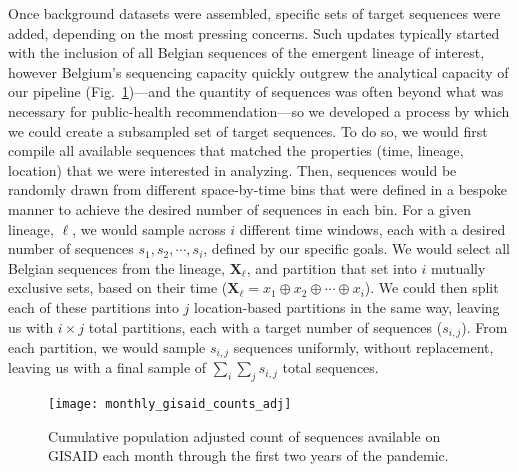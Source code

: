 Once background datasets were assembled, specific sets of target sequences were added, depending on the most pressing concerns.
Such updates typically started with the inclusion of all Belgian sequences of the emergent lineage of interest, however Belgium's sequencing capacity quickly outgrew the analytical capacity of our pipeline (Fig.~\ref{fig:gisaidSeq})---and the quantity of sequences was often beyond what was necessary for public-health recommendation---so we developed a process by which we could create a subsampled set of target sequences.
To do so, we would first compile all available sequences that matched the properties (time, lineage, location) that we were interested in analyzing.
Then, sequences would be randomly drawn from different space-by-time bins that were defined in a bespoke manner to achieve the desired number of sequences in each bin.
For a given lineage, $\ell$, we would sample across $i$ different time windows, each with a desired number of sequences ${s_1,s_2,\cdots,s_i}$, defined by our specific goals.
We would select all Belgian sequences from the lineage, $\mathbf{X}_{\ell}$, and partition that set into $i$ mutually exclusive sets, based on their time ($\mathbf{X}_{\ell} = x_1 \oplus x_2 \oplus \cdots \oplus x_i$).
We could then split each of these partitions into $j$ location-based partitions in the same way, leaving us with $i \times j$ total partitions, each with a target number of sequences ($s_{i,j}$).
From each partition, we would sample $s_{i,j}$ sequences uniformly, without replacement, leaving us with a final sample of $\sum_i \sum_j s_{i,j}$ total sequences.

\begin{figure}[ht]
  \centering
  \texttt{[image: monthly\_gisaid\_counts\_adj]}
  \caption[Population-adjusted GISAID sequences]{Cumulative population adjusted count of sequences available on GISAID each month through the first two years of the pandemic.}
  \label{fig:gisaidSeq}
\end{figure}

